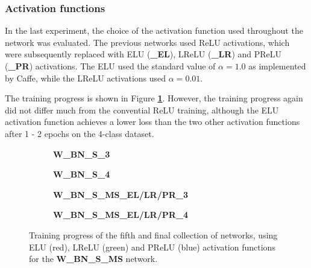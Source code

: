 	\subsubsection{Activation functions}

In the last experiment, the choice of the activation function used throughout the network was evaluated. The previous networks used ReLU activations, which were subsequently replaced with ELU (\textbf{\_EL}), LReLU (\textbf{\_LR}) and PReLU (\textbf{\_PR}) activations. The ELU used the standard value of $\alpha = 1.0$ as implemented by Caffe, while the LReLU activations used $\alpha = 0.01$.

The training progress is shown in Figure \textbf{\ref{fig:weighted_batchnorm_shuffle_msra_acts_training}}. However, the training progress again did not differ much from the convential ReLU training, although the ELU activation function achieves a lower loss than the two other activation functions after 1 - 2 epochs on the 4-class dataset.\\


\begin {figure}[!htb]
	\begin {subfigure}[b]{0.4\linewidth}
		\scalebox{0.65}{}
		\caption{\textbf{W\_BN\_S\_3}}
	\end {subfigure}\hspace{1.75cm}
	\begin {subfigure}[b]{0.4\linewidth}
		\scalebox{0.65}{}
		\caption{\textbf{W\_BN\_S\_4}}
	\end {subfigure}

	\begin {subfigure}[b]{0.4\linewidth}
		\scalebox{0.65}{}
		\caption{\textbf{W\_BN\_S\_MS\_EL/LR/PR\_3}}
	\end {subfigure}\hspace{1.75cm}
	\begin {subfigure}[b]{0.4\linewidth}
		\scalebox{0.65}{}
		\caption{\textbf{W\_BN\_S\_MS\_EL/LR/PR\_4}}
	\end {subfigure}

		\caption[Training progress of the fifth collection of networks.]{Training progress of the fifth and final collection of networks, using ELU (red), LReLU (green) and PReLU (blue) activation functions for the \textbf{W\_BN\_S\_MS} network.}
		\label{fig:weighted_batchnorm_shuffle_msra_acts_training}
\end {figure}


